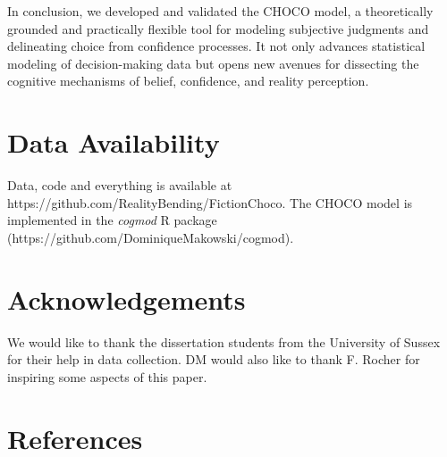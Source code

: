 \documentclass[
  jou,
  floatsintext,
  longtable,
  nolmodern,
  notxfonts,
  notimes,
  colorlinks=true,linkcolor=blue,citecolor=blue,urlcolor=blue]{apa7}
\begin{document}
In conclusion, we developed and validated the CHOCO model, a
theoretically grounded and practically flexible tool for modeling
subjective judgments and delineating choice from confidence processes.
It not only advances statistical modeling of decision-making data but
opens new avenues for dissecting the cognitive mechanisms of belief,
confidence, and reality perception.

\section{Data Availability}\label{data-availability}

Data, code and everything is available at
https://github.com/RealityBending/FictionChoco. The CHOCO model is
implemented in the \emph{cogmod} R package
(https://github.com/DominiqueMakowski/cogmod).

\section{Acknowledgements}\label{acknowledgements}

We would like to thank the dissertation students from the University of
Sussex for their help in data collection. DM would also like to thank F.
Rocher for inspiring some aspects of this paper.

\section{References}\label{references}
\end{document}
